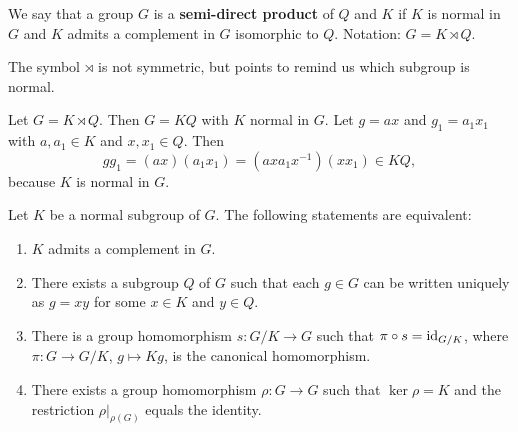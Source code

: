 \begin{definition}
We say that a group $G$ is a \textbf{semi-direct product} of $Q$ and $K$ if $K$ 
is normal in $G$ and 
$K$ admits a complement in $G$ isomorphic to $Q$. Notation: $G=K\rtimes Q$.
\end{definition}

The symbol $\rtimes$ is not symmetric, but points to remind us which subgroup is normal. 

Let $G=K\rtimes Q$. Then $G=KQ$ with $K$ normal in $G$. 
Let $g=ax$ and $g_1=a_1x_1$ with $a,a_1\in K$ and $x,x_1\in Q$. 
Then 
\[
gg_1=(ax)(a_1x_1)=(axa_1x^{-1})(xx_1)\in KQ,
\]
because $K$ is normal in $G$. 

\begin{theorem}
Let $K$ be a normal subgroup of $G$. The following statements are equivalent:
\begin{enumerate}
\item $K$ admits a complement in $G$.
\item There exists a subgroup $Q$ of $G$ such that each $g\in G$ can be written uniquely 
as $g=xy$ for some 
$x\in K$ and $y\in Q$.
\item There is a group homomorphism $s\colon G/K\to G$ such that $\pi\circ s=\operatorname{id}_{G/K}$, where $\pi\colon G\to G/K
$, $g\mapsto Kg$, is the canonical homomorphism.
\item There exists a group homomorphism $\rho\colon G\to G$ such that $\ker\rho=K$ and the restriction $\rho|_{\rho(G)}$ equals the identity. 
\end{enumerate}
\end{theorem}

